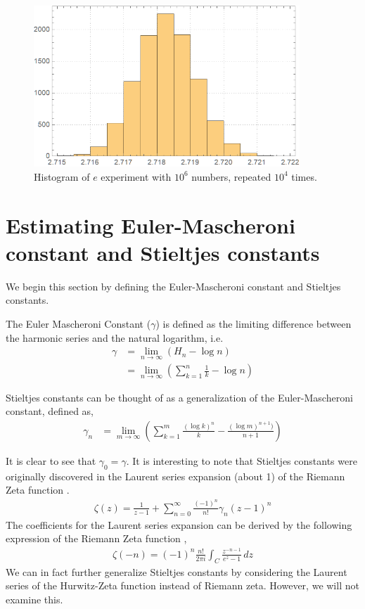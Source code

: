 \documentclass[12pt]{article}
\numberwithin{equation}{section}
\begin{document}
\begin{figure}[!htb]
    \centering
    \includegraphics[width=10cm]{Images/repeatede.png}
    \caption{Histogram of $e$ experiment with $10^6$ numbers, repeated $10^4$ times.}
    \label{fig:repeatede}
\end{figure}
\section{Estimating Euler-Mascheroni constant and Stieltjes constants}
We begin this section by defining the Euler-Mascheroni constant and Stieltjes constants.
\par The Euler Mascheroni Constant ($\gamma$) is defined as the limiting difference between the harmonic series and the natural logarithm, i.e.
\begin{align}
    \gamma &= \lim_{n \rightarrow \infty} \left( H_n - \log n \right)\\ \label{emconstant}
    &= \lim_{n \rightarrow \infty} \left(\sum_{k=1}^{n} \frac{1}{k} - \log n \right) \nonumber
\end{align}
\par Stieltjes constants can be thought of as a generalization of the Euler-Mascheroni constant, defined as,
\begin{align}
    \gamma_n &= \lim_{m \rightarrow \infty} \left( \sum_{k=1}^m \frac{(\log k)^n}{k} - \frac{(\log m)^{n+1})}{n+1} \right)
\end{align}
\par It is clear to see that $\gamma_0=\gamma$. It is interesting to note that Stieltjes constants were originally discovered in the Laurent series expansion (about 1) of the Riemann Zeta function \cite{stieltjeswolfram}.
\begin{align}
    \zeta (z) = \frac{1}{z-1} + \sum_{n=0}^\infty \frac{(-1)^n }{n!} \gamma_n (z-1)^n \label{laurentzeta}
\end{align}
The coefficients for the Laurent series expansion can be derived by the following expression of the Riemann Zeta function \cite[Pg. 215, eq. 60]{alfhors},
\begin{align*}
    \zeta (-n) = (-1)^n \frac{n!}{2 \pi i} \int_C \frac{z^{-n-1}}{e^z-1}\, dz
\end{align*}
We can in fact further generalize Stieltjes constants by considering the Laurent series of the Hurwitz-Zeta function instead of Riemann zeta. However, we will not examine this.
\end{document}
